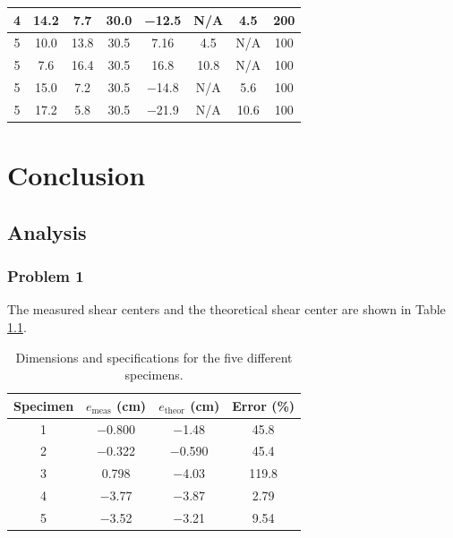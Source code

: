 \documentclass[12 pt]{report}
\begin{document}
\begin{table}[!htbp]
\begin{center}
\begin{tabular}{|c|c|c|c|c|c|c|c|}
		\hline
		\num{4}&\num{14.2}&\num{7.7}&\num{30.0}&\num{-12.5}&N/A&\num{4.5}&\num{200}\\
		\hline
		\num{5}&\num{10.0}&\num{13.8}&\num{30.5}&\num{7.16}&\num{4.5}&N/A&\num{100}\\
		\hline
		\num{5}&\num{7.6}&\num{16.4}&\num{30.5}&\num{16.8}&\num{10.8}&N/A&\num{100}\\
		\hline
		\num{5}&\num{15.0}&\num{7.2}&\num{30.5}&\num{-14.8}&N/A&\num{5.6}&\num{100}\\
		\hline
		\num{5}&\num{17.2}&\num{5.8}&\num{30.5}&\num{-21.9}&N/A&\num{10.6}&\num{100}\\
		\hline
	\end{tabular}
\end{center}
\label{tbl:data}
\end{table}

\chapter{Conclusion} \label{conclusion-chapter}
\section{Analysis} \label{analysis}
\subsection{Problem 1}
The measured shear centers and the theoretical shear center are shown in Table \ref{tbl:shear_centers}.

\begin{table}[!htbp]
\caption{Dimensions and specifications for the five different specimens.}
\begin{center}
	\begin{tabular}{|c|c|c|c|}
		\hline
		Specimen&$e_\text{meas}$ (\unit{cm})&$e_\text{theor}$  (\unit{cm})&Error (\unit{\percent})\\
		\hline
		1&\num{-0.800}&\num{-1.48}&\num{45.8}\\
		\hline
		2&\num{-0.322}&\num{-0.590}&\num{45.4}\\
		\hline
		3&\num{0.798}&\num{-4.03}&\num{119.8}\\
		\hline
		4&\num{-3.77}&\num{-3.87}&\num{2.79}\\
		\hline
		5&\num{-3.52}&\num{-3.21}&\num{9.54}\\
		\hline
	\end{tabular}
\end{center}
\label{tbl:shear_centers}
\end{table}
\end{document}

